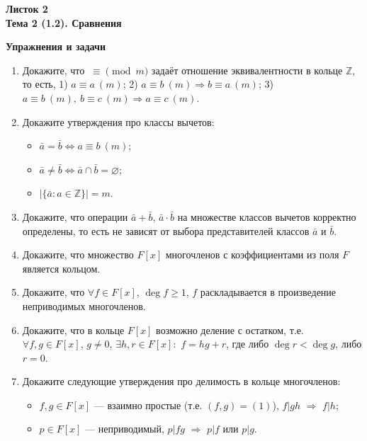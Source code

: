 \documentclass[a4paper, 11pt]{article}
\begin{document}
\begin{center} \Large \bf Листок 2\\ Тема 2 (1.2). Сравнения \end{center}

\noindent\textbf{Упражнения и задачи}

\begin{enumerate}[topsep=0pt]
    \item Докажите, что $\ \equiv \pmod{m}$ задаёт отношение эквивалентности в кольце $\mathbb{Z}$, то есть, 1) $a \equiv a\ (m)$; 2) $a \equiv b\ (m) \Rightarrow b \equiv a\ (m)$; 3) $a \equiv b\ (m),\ b \equiv c\ (m) \Rightarrow a \equiv c\ (m)$.

    \item Докажите утверждения про классы вычетов: 
    \begin{itemize}
        \item $\bar{a} = \bar{b} \Leftrightarrow a \equiv b\ (m)$;
        \item $\bar{a} \neq \bar{b} \Leftrightarrow \bar{a} \cap \bar{b}=\varnothing$;
        \item $|\{\bar{a}: a\in \mathbb{Z}\}|=m$.
    \end{itemize}

    \item Докажите, что операции $\bar{a}+\bar{b}$, $\bar{a} \cdot \bar{b}$ на множестве классов вычетов корректно определены, то есть не зависят от выбора представителей классов $\bar{a}$ и $\bar{b}$.

    \item Докажите, что множество $F[x]$ многочленов с коэффициентами из поля $F$ является кольцом.

    \item Докажите, что $\forall f\in F[x]$, $\deg f \geqslant 1$, $f$ раскладывается в произведение неприводимых многочленов.

    \item Докажите, что в кольце $F[x]$ возможно деление с остатком, т.е. $\forall f,g \in F[x]$, $g \neq 0$, $\exists h,r\in F[x]:$ $f=hg+r$, где либо $\deg r < \deg g$, либо $r=0$.

    \item Докажите следующие утверждения про делимость в кольце многочленов:
    \begin{itemize}
        \item $f,g\in F[x]$ --- взаимно простые (т.е. $(f,g)=(1)$), $f|gh$ $\Rightarrow$ $f|h$;
        \item $p \in F[x]$ --- неприводимый, $p|fg$ $\Rightarrow$ $p|f$ или $p|g$.
    \end{itemize}


\end{enumerate}
\end{document}
